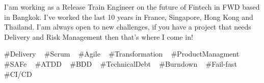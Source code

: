 

\begin{cvparagraph}


I'am working as a Release Train Engineer on the future of Fintech in FWD based in Bangkok.
I’ve worked the last 10 years in France, Singapore, Hong Kong and Thailand.
I'am always open to new challenges, if you have a project that needs Delivery and Risk Management then that’s where I come in!


\end{cvparagraph}
\begin{cvtechnologies}
 \#Delivery  ~
 \#Scrum ~
 \#Agile ~
 \#Transformation ~
 \#ProductManagment ~
 \#SAFe ~
 \#ATDD ~
  \#BDD ~
  \#TechnicalDebt ~
  \#Burndown ~
  \#Fail-fast ~
  \#CI/CD ~
 \end{cvtechnologies}

